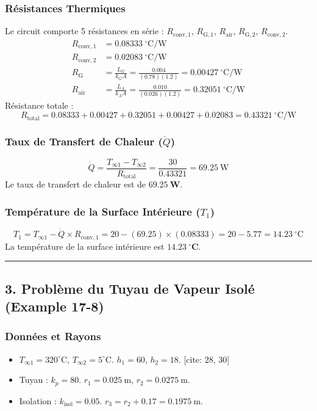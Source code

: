 \documentclass{rapportECL}
\begin{document}
\subsubsection*{Résistances Thermiques}
Le circuit comporte 5 résistances en série : $R_{\text{conv}, 1}$, $R_{\text{G}, 1}$, $R_{\text{air}}$, $R_{\text{G}, 2}$, $R_{\text{conv}, 2}$.
\begin{align*}
    R_{\text{conv}, 1} &= 0.08333 \ ^\circ\text{C/W} \\
    R_{\text{conv}, 2} &= 0.02083 \ ^\circ\text{C/W} \\
    R_{\text{G}} &= \frac{L_G}{k_G A} = \frac{0.004}{(0.78)(1.2)} = 0.00427 \ ^\circ\text{C/W} \\
    R_{\text{air}} &= \frac{L_A}{k_A A} = \frac{0.010}{(0.026)(1.2)} = 0.32051 \ ^\circ\text{C/W}
\end{align*}
Résistance totale :
$$R_{\text{total}} = 0.08333 + 0.00427 + 0.32051 + 0.00427 + 0.02083 = 0.43321 \ ^\circ\text{C/W}$$

\subsubsection*{Taux de Transfert de Chaleur ($\dot{Q}$)}
$$\dot{Q} = \frac{T_{\infty 1} - T_{\infty 2}}{R_{\text{total}}} = \frac{30}{0.43321} = 69.25 \ \text{W}$$
Le taux de transfert de chaleur est de $\mathbf{69.25 \ \text{W}}$.

\subsubsection*{Température de la Surface Intérieure ($T_1$)}
$$T_1 = T_{\infty 1} - \dot{Q} \times R_{\text{conv}, 1} = 20 - (69.25) \times (0.08333) = 20 - 5.77 = 14.23 \ ^\circ\text{C}$$
La température de la surface intérieure est $\mathbf{14.23 \ ^\circ\text{C}}$.

\vspace{0.5cm}
\hrule
\vspace{0.5cm}

\subsection*{3. Problème du Tuyau de Vapeur Isolé (Example 17-8)}
\subsubsection*{Données et Rayons}
\begin{itemize}
    \item $T_{\infty 1} = 320^\circ\text{C}$, $T_{\infty 2} = 5^\circ\text{C}$. $h_1 = 60$, $h_2 = 18$. [cite: 28, 30]
    \item Tuyau : $k_p=80$. $r_1 = 0.025 \ \text{m}$, $r_2 = 0.0275 \ \text{m}$. 
    \item Isolation : $k_{\text{isol}}=0.05$. $r_3 = r_2 + 0.17 = 0.1975 \ \text{m}$. 
\end{itemize}
\end{document}
